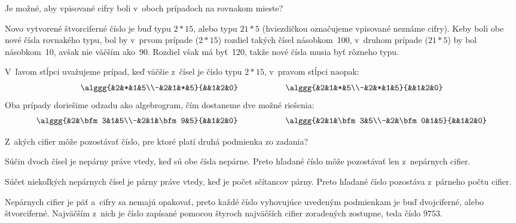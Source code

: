 {%
\napad
Je možné, aby vpisované cifry boli v~oboch prípadoch na rovnakom
mieste?

\riesenie
Novo vytvorené štvorciferné číslo je buď typu $2{*}15$, alebo
typu $21{*}5$ (hviezdičkou označujeme vpisované neznáme cifry).
Keby boli obe nové čísla rovnakého typu, bol by v~prvom prípade
($2{*}15$) rozdiel takých čísel násobkom~100, v~druhom prípade ($21{*}5$)
by bol násobkom~10, avšak nie väčším ako~90.
Rozdiel však má byť~120, takže nové čísla musia byť rôzneho typu.

V~ľavom stĺpci uvažujeme prípad, keď väčšie z~čísel je číslo typu $2{*}15$,
v~pravom stĺpci naopak:
$$
\alggg{&2&*&1&5\\-&2&1&*&5}{&&1&2&0}
\hskip2cm
\alggg{&2&1&*&5\\-&2&*&1&5}{&&1&2&0}
$$
Oba prípady doriešime odzadu ako algebrogram, čím dostaneme dve možné riešenia:
$$
\alggg{&2&\bfm 3&1&5\\-&2&1&\bfm 9&5}{&&1&2&0}
\hskip2cm
\alggg{&2&1&\bfm 3&5\\-&2&\bfm 0&1&5}{&&1&2&0}
$$}

{%
\napad
Z~akých cifier môže pozostávať číslo, pre ktoré platí druhá podmienka zo zadania?

\riesenie
Súčin dvoch čísel je nepárny práve vtedy, keď sú obe čísla nepárne.
Preto hľadané číslo môže pozostávať len z~nepárnych cifier.

Súčet niekoľkých nepárnych čísel je párny práve vtedy, keď je počet sčítancov párny.
Preto hľadané číslo pozostáva z~párneho počtu cifier.

Nepárnych cifier je päť a~cifry sa nemajú opakovať, preto každé číslo
vyhovujúce uvedeným podmienkam je buď dvojciferné, alebo štvorciferné.
Najväčším z~nich je číslo zapísané pomocou štyroch najväčších cifier zoradených
zostupne, teda číslo $9753$.
}

